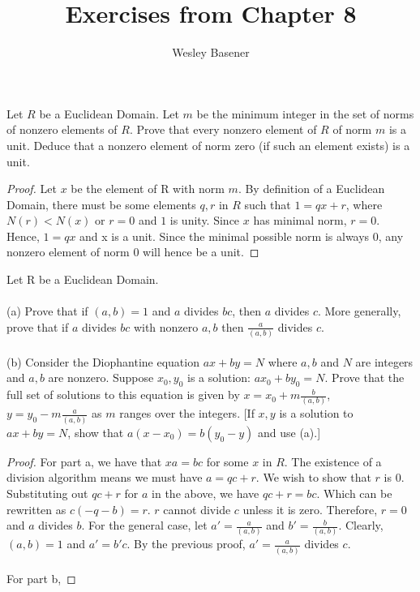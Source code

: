\documentclass[10pt]{article}
\newenvironment{problem}[2][Problem]{\begin{trivlist}
		\item[\hskip \labelsep {\bfseries #1}\hskip \labelsep {\bfseries #2.}]}{\end{trivlist}}
\begin{document}
	
	\title{Exercises from Chapter 8}
	\author{Wesley Basener}
	\maketitle
	
	\begin{problem}{1.3}
		Let $R$ be a Euclidean Domain. Let $\mathit{m}$ be the minimum integer in the set of norms of nonzero elements of $R$. Prove that every nonzero element of $R$ of norm $\mathit{m}$ is a unit. Deduce that a nonzero element of norm zero (if such an element exists) is a unit.
		\begin{proof}
			Let $x$ be the element of R with norm $\mathit{m}$. By definition of a Euclidean Domain, there must be some elements $q, r$ in $R$ such that $1 = qx + r$, where $N(r)<N(x)$ or $r=0$ and $1$ is unity. Since $x$ has minimal norm, $r=0$. Hence, $1=qx$ and x is a unit. Since the minimal possible norm is always $0$, any nonzero element of norm $0$ will hence be a unit.
			\end{proof}
	\end{problem}
	
	\begin{problem}{1.4}
		Let R be a Euclidean Domain.\\
		\\
		(a) Prove that if $(a,b)=1$ and $a$ divides $bc$, then $a$ divides $c$. More generally, prove that if $a$ divides $bc$ with nonzero $a,b$ then $\frac{a}{(a,b)}$ divides $c$.\\
		\\
		(b) Consider the Diophantine equation $ax+by=N$ where $a,b$ and $N$ are integers and $a,b$ are nonzero. Suppose $x_{0}, y_{0}$ is a solution: $ax_{0}+by_{0}=N$. Prove that the full set of solutions to this equation is given by
		$x=x_{0} + m \frac{b}{(a,b)}$, $y=y_{0} - m \frac{a}{(a,b)}$
		as $m$ ranges over the integers. [If $x,y$ is a solution to $ax+by=N$, show that $a(x-x_{0}) = b(y_{0} - y)$ and use (a).]
	
	
		\begin{proof}
			For part a, we have that $xa = bc$ for some $x$ in $R$. The existence of a division algorithm means we must have $a = qc + r$. We wish to show that $r$ is $0$. Substituting out $qc+r$ for $a$ in the above, we have $qc + r = bc$. Which can be rewritten as $c(-q-b) = r$. $r$ cannot divide $c$ unless it is zero. Therefore, $r=0$ and $a$ divides $b$. For the general case, let $a'= \frac{a}{(a,b)}$ and $b'= \frac{b}{(a,b)}$. Clearly, $(a,b)=1$ and $a'=b'c$. By the previous proof, $a'=\frac{a}{(a,b)}$ divides $c$.\\
			\\
			For part b, 
		\end{proof}
	\end{problem}
	
\end{document}
